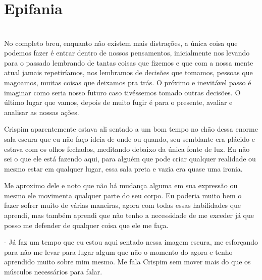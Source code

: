 
    



\newpage


\ifdefined\useChapters
\chapter{Epifania}

\else
\chapter{}
\fi


No completo breu, enquanto não existem mais distrações, a única coisa que podemos fazer é entrar dentro de nossos pensamentos, inicialmente nos levando para o passado lembrando de tantas coisas que fizemos e que com a nossa mente atual jamais repetiríamos, nos lembramos de decisões que tomamos, pessoas que magoamos, muitas coisas que deixamos pra trás. O próximo e inevitável passo é imaginar como seria nosso futuro caso tivéssemos tomado outras decisões. O último lugar que vamos, depois de muito fugir é para o presente, avaliar e analisar as nossas ações.

Crispim aparentemente estava ali sentado a um bom tempo no chão dessa enorme sala escura que eu não faço ideia de onde ou quando, seu semblante era plácido e estava com os olhos fechados, meditando debaixo da única fonte de luz. Eu não sei o que ele está fazendo aqui, para alguém que pode criar qualquer realidade ou mesmo estar em qualquer lugar, essa sala preta e vazia era quase uma ironia.

Me aproximo dele e noto que não há mudança alguma em sua expressão ou mesmo ele movimenta qualquer parte do seu corpo. Eu poderia muito bem o fazer sofrer muito de várias maneiras, agora com todas essas habilidades que aprendi, mas também aprendi que não tenho a necessidade de me exceder já que posso me defender de qualquer coisa que ele me faça.

- Já faz um tempo que eu estou aqui sentado nessa imagem escura, me esforçando para não me levar para lugar algum que não o momento do agora e tenho aprendido muito sobre mim mesmo. Me fala Crispim sem mover mais do que os músculos necessários para falar.

